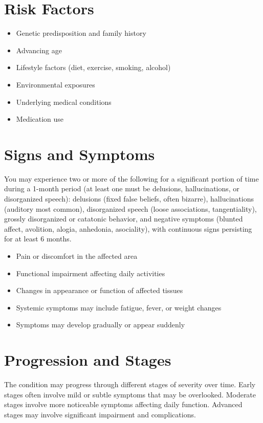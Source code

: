 \section{Risk Factors}
\begin{itemize}[noitemsep]
  \item Genetic predisposition and family history
  \item Advancing age
  \item Lifestyle factors (diet, exercise, smoking, alcohol)
  \item Environmental exposures
  \item Underlying medical conditions
  \item Medication use
\end{itemize}
\section{Signs and Symptoms}
You may experience two or more of the following for a significant portion of time during a 1-month period (at least one must be delusions, hallucinations, or disorganized speech): delusions (fixed false beliefs, often bizarre), hallucinations (auditory most common), disorganized speech (loose associations, tangentiality), grossly disorganized or catatonic behavior, and negative symptoms (blunted affect, avolition, alogia, anhedonia, asociality), with continuous signs persisting for at least 6 months.

\begin{itemize}[noitemsep]
  \item Pain or discomfort in the affected area
  \item Functional impairment affecting daily activities
  \item Changes in appearance or function of affected tissues
  \item Systemic symptoms may include fatigue, fever, or weight changes
  \item Symptoms may develop gradually or appear suddenly
\end{itemize}
\section{Progression and Stages}
The condition may progress through different stages of severity over time. Early stages often involve mild or subtle symptoms that may be overlooked. Moderate stages involve more noticeable symptoms affecting daily function. Advanced stages may involve significant impairment and complications.
